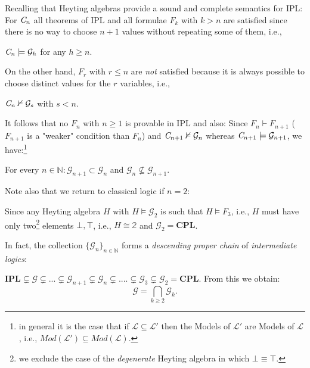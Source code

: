 	Recalling that Heyting algebras provide a sound and complete semantics for IPL:
\newline
		For $\emph{C}_n$ all theorems of IPL and all formulae $F_k$ with $k > n$ are satisfied since there is no way to choose $n+1$ values without repeating some of them, i.e.,
		\begin{lem}
			$\emph{C}_n \models \mathcal{G}_h$ for any $h \geq n$. 
		\end{lem}
		 On the other hand, $F_r$ with $r \leq n$ are \emph{not} satisfied because it is always possible to choose distinct values for the $r$ variables, i.e.,
		 \begin{lem}
		 	 $\emph{C}_n \nvDash \mathcal{G}_s$ with $s < n$.
		 \end{lem}
				It follows that no $F_n$ with $n \geq 1$ is provable in IPL and also:
\newline
			Since  $F_n \vdash F_{n+1}$ ($F_{n+1}$ is a "weaker" condition than $F_n$) and $\emph{C}_{n+1} \nvDash \mathcal{G}_n$ whereas $\emph{C}_{n+1} \models \mathcal{G}_{n+1}$, we have:\footnote{in general it is the case that if $\mathcal{L} \subseteq \mathcal{L}'$ then the Models of $\mathcal{L}'$ are  Models of $\mathcal{L}$, i.e., $Mod(\mathcal{L}') \subseteq Mod(\mathcal{L})$.}
			\begin{lem}
				For every $n \in \mathbb{N} : \mathcal{G}_{n+1} \subset \mathcal{G}_n$ and  
				$\mathcal{G}_{n} \nsubseteq \mathcal{G}_{n+1}$.
			\end{lem}
		Note also that we return to classical logic if $n=2$: 
		\begin{remark}
			Since any Heyting algebra $H$ with $H \models \mathcal{G}_2$ is such that $H \models F_3$, i.e., $H$ must have only two\footnote{we exclude the case of the \emph{degenerate} Heyting algebra in which $\bot\equiv\top$.} elements $\bot,\top$, i.e., $H \cong \mathbb{2}$ and	$\mathcal{G}_2 = \textbf{CPL}$.
		\end{remark}
		
		In fact, the collection $\{ \mathcal{G}_n \}_{n\in \mathbb{N}}$ forms a \emph{descending proper chain} of \emph{intermediate logics}:
		
		\begin{prop}
			$\textbf{IPL} \subsetneq \mathcal{G} \subsetneq... \subsetneq \mathcal{G}_{n+1} \subsetneq \mathcal{G}_n \subsetneq ....\subsetneq \mathcal{G}_3 \subsetneq \mathcal{G}_2 = \textbf{CPL}$.
		From this we obtain:
		\begin{equation*}
			\mathcal{G} = \bigcap_{k\geq2}  \mathcal{G}_k. 
		\end{equation*}
		\end{prop}

